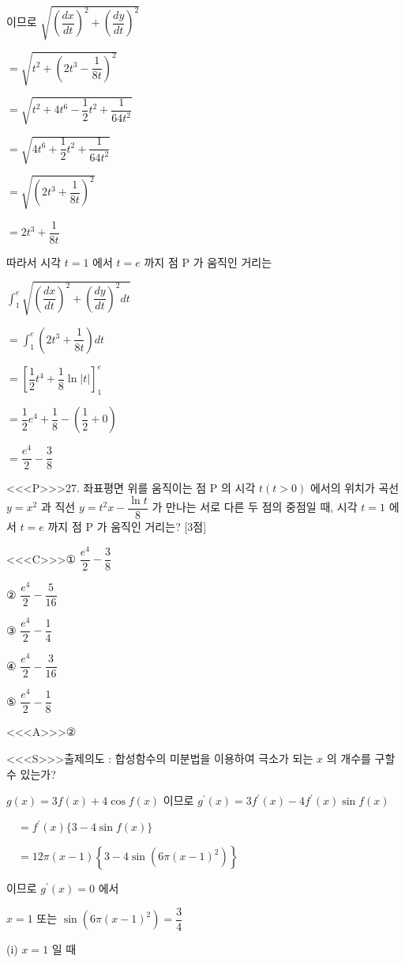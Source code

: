 \documentclass{oblivoir}
\begin{document}
이므로
$\sqrt{\left(\dfrac{d x}{d t}\right)^{2}+\left(\dfrac{d y}{d t}\right)^{2}}$

$=\sqrt{t^{2}+\left(2 t^{3}-\dfrac{1}{8 t}\right)^{2}}$

$=\sqrt{t^{2}+4 t^{6}-\dfrac{1}{2} t^{2}+\dfrac{1}{64 t^{2}}}$

$=\sqrt{4 t^{6}+\dfrac{1}{2} t^{2}+\dfrac{1}{64 t^{2}}}$

$=\sqrt{\left(2 t^{3}+\dfrac{1}{8 t}\right)^{2}}$

$=2 t^{3}+\dfrac{1}{8 t}$

따라서 시각 $t=1$ 에서 $t=e$ 까지 점 $\mathrm{P}$ 가 움직인 거리는

$\displaystyle\int_{1}^{e} \sqrt{\left(\dfrac{d x}{d t}\right)^{2}+\left(\dfrac{d y}{d t}\right)^{2} d t}$

$=\displaystyle\int_{1}^{e}\left(2 t^{3}+\dfrac{1}{8 t}\right) d t$

$=\left[\dfrac{1}{2} t^{4}+\dfrac{1}{8} \ln |t|\right]_{1}^{e}$

$=\dfrac{1}{2} e^{4}+\dfrac{1}{8}-\left(\dfrac{1}{2}+0\right)$

$=\dfrac{e^{4}}{2}-\dfrac{3}{8}$


<<<P>>>27. 좌표평면 위를 움직이는 점 $\mathrm{P}$ 의 시각 $t(t>0)$ 에서의 위치가 곡선 $y=x^{2}$ 과 직선 $y=t^{2} x-\dfrac{\ln t}{8}$ 가 만나는 서로 다른 두 점의 중점일 때, 시각 $t=1$ 에서 $t=e$ 까지 점 $\mathrm{P}$ 가 움직인 거리는? [3점]

<<<C>>>① $\dfrac{e^{4}}{2}-\dfrac{3}{8}$

② $\dfrac{e^{4}}{2}-\dfrac{5}{16}$

③ $\dfrac{e^{4}}{2}-\dfrac{1}{4}$

④ $\dfrac{e^{4}}{2}-\dfrac{3}{16}$

⑤ $\dfrac{e^{4}}{2}-\dfrac{1}{8}$


<<<A>>>②

<<<S>>>출제의도 : 합성함수의 미분법을 이용하여 극소가 되는 $x$ 의 개수를 구할 수 있는가?

$g(x)=3 f(x)+4 \cos f(x)$ 이므로
$g^{\prime}(x)=3 f^{\prime}(x)-4 f^{\prime}(x) \sin f(x)$

$\quad=f^{\prime}(x)\{3-4 \sin f(x)\}$

$\quad=12 \pi(x-1)\left\{3-4 \sin \left(6 \pi(x-1)^{2}\right)\right\}$

이므로 $g^{\prime}(x)=0$ 에서

$x=1$ 또는 $\sin \left(6 \pi(x-1)^{2}\right)=\dfrac{3}{4}$

(i) $x=1$ 일 때
\end{document}
